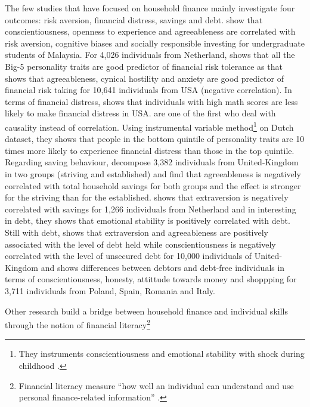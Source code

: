 \documentclass[a4paper, 11pt, onecolumn]{article}
\begin{document}
The few studies that have focused on household finance mainly investigate four outcomes: risk aversion, financial distress, savings and debt.
\cite{Nga2013} show that conscientiousness, openness to experience and agreeableness are correlated with risk aversion, cognitive biases and socially responsible investing for undergraduate students of Malaysia.
For 4,026 individuals from Netherland, \cite{Pinjisakikool2017} shows that all the Big-5 personality traits are good predictor of financial risk tolerance as \cite{Bucciol2017} that shows that agreeableness, cynical hostility and anxiety are good predictor of financial risk taking for 10,641 individuals from USA (negative correlation).
In terms of financial distress, \cite{Agarwal2013} shows that individuals with high math scores are less likely to make financial distress in USA.
\cite{Parise2019} are one of the first who deal with causality instead of correlation.
Using instrumental variable method\footnote{They instruments conscientiousness and emotional stability with shock during childhood .} on Dutch dataset, they shows that people in the bottom quintile of personality traits are 10 times more likely to experience financial distress than those in the top quintile.
Regarding saving behaviour, \cite{Gerhard2018} decompose 3,382 individuals from United-Kingdom in two groups (striving and established) and find that agreeableness is negatively correlated with total household savings for both groups and the effect is stronger for the striving than for the established.
\cite{Nyhus2001} shows that extraversion is negatively correlated with savings for 1,266 individuals from Netherland and in interesting in debt, they shows that emotional stability is positively correlated with debt.
Still with debt, \cite{Brown2014} shows that extraversion and agreeableness are positively associated with the level of debt held while conscientiousness is negatively correlated with the level of unsecured debt for 10,000 individuals of United-Kingdom and \cite{Forlicz2019} shows differences between debtors and debt-free individuals in terms of conscientiousness, honesty, attittude towards money and shoppping for 3,711 individuals from Poland, Spain, Romania and Italy.

Other research build a bridge between household finance and individual skills through the notion of financial literacy\footnote{Financial literacy measure ``how well an individual can understand and use personal finance-related information'' \citep{Huston2010}.} \citep{Hastings2013} \citep{Gaurav2012} \citep{Klapper2012}
\end{document}
